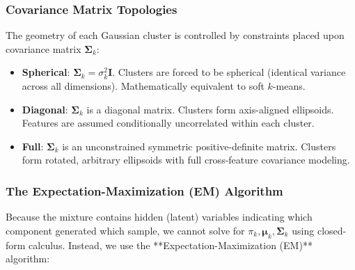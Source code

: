 \subsubsection{Covariance Matrix Topologies}
The geometry of each Gaussian cluster is controlled by constraints placed upon covariance matrix $\mathbf{\Sigma}_k$:
\begin{itemize}
    \item \textbf{Spherical}: $\mathbf{\Sigma}_k = \sigma_k^2 \mathbf{I}$. Clusters are forced to be spherical (identical variance across all dimensions). Mathematically equivalent to soft $k$-means.
    \item \textbf{Diagonal}: $\mathbf{\Sigma}_k$ is a diagonal matrix. Clusters form axis-aligned ellipsoids. Features are assumed conditionally uncorrelated within each cluster.
    \item \textbf{Full}: $\mathbf{\Sigma}_k$ is an unconstrained symmetric positive-definite matrix. Clusters form rotated, arbitrary ellipsoids with full cross-feature covariance modeling.
\end{itemize}

\subsubsection{The Expectation-Maximization (EM) Algorithm}
Because the mixture contains hidden (latent) variables indicating which component generated which sample, we cannot solve for $\pi_k, \boldsymbol{\mu}_k, \mathbf{\Sigma}_k$ using closed-form calculus. Instead, we use the **Expectation-Maximization (EM)** algorithm:

